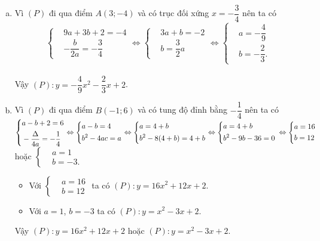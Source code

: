 \begin{bt}
{\begin{enumerate}[a)]
			\item Vì $(P)$ đi qua điểm $A(3;-4)$ và có trục đối xứng $x=-\dfrac{3}{4}$ nên ta có $$\left\{\begin{aligned}
				&9a+3b+2=-4\\
				&-\dfrac{b}{2a}=-\dfrac{3}{4}
			\end{aligned}\right. \Leftrightarrow \left\{\begin{aligned}
				&3a+b=-2\\
				&b=\dfrac{3}{2}a
			\end{aligned}\right. \Leftrightarrow \left\{\begin{aligned}
				&a=-\dfrac{4}{9}\\
				&b=-\dfrac{2}{3}.
			\end{aligned}\right. $$\\
			Vậy $(P)\colon y=-\dfrac{4}{9}x^2-\dfrac{2}{3}x+2$.
			\item Vì $(P)$ đi qua điểm $B(-1;6)$ và có tung độ đỉnh bằng $-\dfrac{1}{4}$ nên ta có\\
			$\left\{\begin{aligned}
				&a-b+2=6\\
				&-\dfrac{\Delta}{4a}=-\dfrac{1}{4}
			\end{aligned}\right. \Leftrightarrow \left\{\begin{aligned}
				&a-b=4\\
				&b^2-4ac=a
			\end{aligned}\right. \Leftrightarrow \left\{\begin{aligned}
				&a=4+b\\
				&b^2-8(4+b)=4+b
			\end{aligned}\right. \Leftrightarrow \left\{\begin{aligned}
				&a=4+b\\
				&b^2-9b-36=0
			\end{aligned}\right. \\ \Leftrightarrow \left\{\begin{aligned}
				&a=16\\
				&b=12
			\end{aligned}\right. $ hoặc $\left\{\begin{aligned}
				&a=1\\
				&b=-3.
			\end{aligned}\right. $
			\begin{itemize}
				\item Với $\left\{\begin{aligned}
					&a=16\\
					&b=12
				\end{aligned}\right. $ ta có $(P)\colon y=16x^2+12x+2$.
				\item Với $a=1$, $b=-3$ ta có $(P)\colon y=x^2-3x+2$.
			\end{itemize}
			Vậy $(P)\colon y=16x^2+12x+2$ hoặc $(P)\colon y=x^2-3x+2$.
		\end{enumerate}	
	}
\end{bt}

